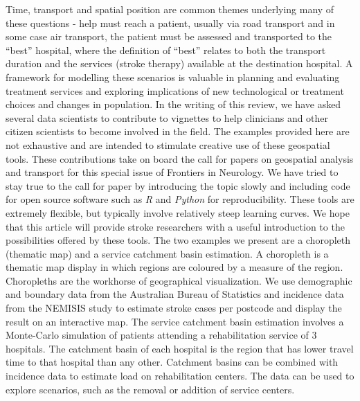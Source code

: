 \documentclass[utf8]{frontiersHLTH}
\begin{document}
Time, transport and spatial position are common themes underlying many
of these questions - help must reach a patient, usually via road
transport and in some case air transport, the patient must be assessed
and transported to the ``best'' hospital, where the definition of
``best'' relates to both the transport duration and the services
(stroke therapy) available at the destination hospital. A framework
for modelling these scenarios is valuable in planning and evaluating
treatment services and exploring implications of new technological or
treatment choices and changes in population. In the writing of this
review, we have asked several data scientists to contribute to
vignettes to help clinicians and other citizen scientists to become
involved in the field. The examples provided here are not exhaustive
and are intended to stimulate creative use of these geospatial
tools. These contributions take on board the call for papers on
geospatial analysis and transport for this special issue of Frontiers
in Neurology. We have tried to stay true to the call for paper by
introducing the topic slowly and including code for open source software
such as {\em R} and {\em Python} for reproducibility. These tools are extremely
flexible, but typically involve relatively steep learning curves. We
hope that this article will provide stroke researchers with a useful
introduction to the possibilities offered by these tools. The two
examples we present are a choropleth (thematic map) and a service
catchment basin estimation. A choropleth is a thematic map display in
which regions are coloured by a measure of the region. Choropleths are
the workhorse of geographical visualization. We use demographic and
boundary data from the Australian Bureau of Statistics and incidence
data from the NEMISIS
\cite{thrift_stroke_2000,azarpazhooh2008patterns} study to estimate
stroke cases per postcode and display the result on an interactive
map. The service catchment basin estimation involves a Monte-Carlo
simulation of patients attending a rehabilitation service of 3
hospitals. The catchment basin of each hospital is the region that has
lower travel time to that hospital than any other.  Catchment basins
can be combined with incidence data to estimate load on rehabilitation
centers. The data can be used to explore scenarios, such as the
removal or addition of service centers.

\end{document}
